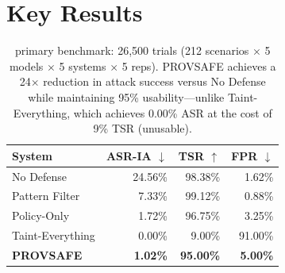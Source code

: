 \documentclass[11pt]{article}
\begin{document}
\section*{Key Results}

\begin{table}[h]
\centering
\small
\begin{tabular}{lrrr}
\toprule
\textbf{System} & \textbf{ASR-IA $\downarrow$} & \textbf{TSR $\uparrow$} & \textbf{FPR $\downarrow$} \\
\midrule
No Defense        & 24.56\% & 98.38\% & 1.62\% \\
Pattern Filter    & 7.33\%  & 99.12\% & 0.88\% \\
Policy-Only       & 1.72\%  & 96.75\% & 3.25\% \\
Taint-Everything  & 0.00\%  & 9.00\% & 91.00\% \\
\textbf{PROVSAFE} & \textbf{1.02\%} & \textbf{95.00\%} & \textbf{5.00\%} \\
\bottomrule
\end{tabular}
\caption{primary benchmark: 26,500 trials (212 scenarios $\times$ 5 models $\times$ 5 systems $\times$ 5 reps). PROVSAFE achieves a 24$\times$ reduction in attack success versus No Defense while maintaining 95\% usability---unlike Taint-Everything, which achieves 0.00\% ASR at the cost of 9\% TSR (unusable).}
\end{table}
\end{document}
